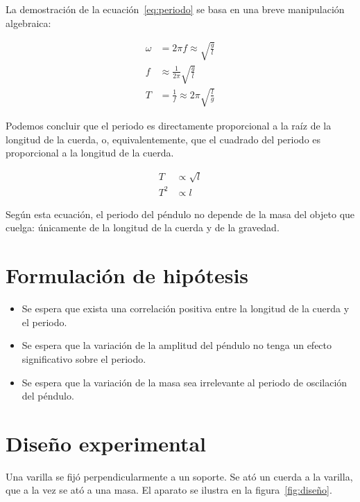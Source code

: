 \documentclass[twocolumn]{report}
\numberwithin{table}{section}
\begin{document}
La demostración de la ecuación~\eqref{eq:periodo} se basa en una
breve manipulación algebraica:

\begin{align*}
  \omega &= 2\pi f \approx \sqrt{\frac{g}{l}} \\
  f &\approx \frac{1}{2\pi}\sqrt{\frac{g}{l}} \\
  T &= \frac{1}{f} \approx 2\pi\sqrt{\frac{l}{g}}
\end{align*}

Podemos concluir que el periodo es directamente proporcional a la raíz de la
longitud de la cuerda, o, equivalentemente, que el cuadrado del periodo es
proporcional a la longitud de la cuerda.

\begin{align}
  T &\propto \sqrt{l} \\
  T^{2} &\propto l
  \label{eq:periodo_proporcionalidad}
\end{align}

Según esta ecuación, el periodo del péndulo no depende de la masa del objeto que
cuelga: únicamente de la longitud de la cuerda y de la gravedad.

\section{Formulación de hipótesis}

\begin{itemize}
  \item Se espera que exista una correlación positiva entre la longitud
    de la cuerda y el periodo.
  \item Se espera que la variación de la amplitud del péndulo no tenga un
    efecto significativo sobre el periodo.
  \item Se espera que la variación de la masa sea irrelevante al periodo
    de oscilación del péndulo.
\end{itemize}

\section{Diseño experimental}

Una varilla se fijó perpendicularmente a un soporte. Se ató un cuerda a
la varilla, que a la vez se ató a una masa. El aparato se ilustra en la
figura~\ref{fig:diseño}.
\end{document}
